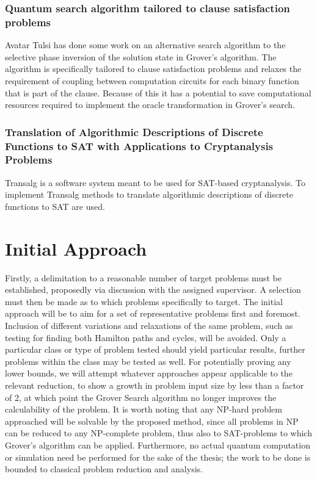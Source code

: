 \documentclass[msc,lith,english]{liuthesis}
\begin{document}
\subsubsection{Quantum search algorithm tailored to clause satisfaction problems}
Avatar Tulsi has done some work on an alternative search algorithm to the selective phase inversion of the solution state in Grover's algorithm. The algorithm is specifically tailored to clause satisfaction problems and relaxes the requirement of coupling between computation circuits for each binary function that is part of the clause. Because of this it has a potential to save computational resources required to implement the oracle transformation in Grover's search.\cite{QuantumCSPSearch}

\subsubsection{Translation of Algorithmic Descriptions of Discrete Functions to SAT with Applications to Cryptanalysis Problems}
Transalg is a software system meant to be used for SAT-based cryptanalysis. To implement Transalg methods to translate algorithmic descriptions of discrete functions to SAT are used.\cite{Transalg}

\section{Initial Approach}
Firstly, a delimitation to a reasonable number of target problems must be established, proposedly via discussion with the assigned supervisor. A selection must then be made as to which problems specifically to target. The initial approach will be to aim for a set of representative problems first and foremost. Inclusion of different variations and relaxations of the same problem, such as testing for finding both Hamilton paths and cycles, will be avoided. Only a particular class or type of problem tested should yield particular results, further problems within the class may be tested as well. For potentially proving any lower bounds, we will attempt whatever approaches appear applicable to the relevant reduction, to show a growth in problem input size by less than a factor of 2, at which point the Grover Search algorithm no longer improves the calculability of the problem. It is worth noting that any NP-hard problem approached will be solvable by the proposed method, since all problems in NP can be reduced to any NP-complete problem, thus also to SAT-problems to which Grover’s algorithm can be applied. Furthermore, no actual quantum computation or simulation need be performed for the sake of the thesis; the work to be done is bounded to classical problem reduction and analysis.

\printbibliography
\end{document}
